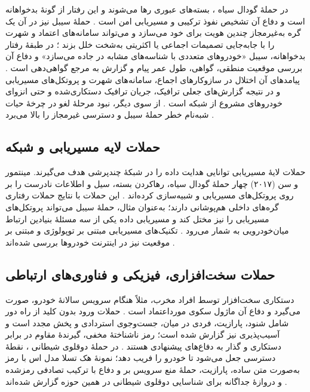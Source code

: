 در حملهٔ گودال سیاه ، بسته‌های عبوری رها می‌شوند و این رفتار از گونهٔ بدخواهانه است و دفاع آن تشخیص نفوذ ترکیبی و مسیریابی امن است \cite{farsimadanReviewSecurityChallenges2025}. حملهٔ سیبل  نیز در آن یک گره به‌غیرمجاز چندین هویت برای خود می‌سازد و می‌تواند سامانه‌های اعتماد و شهرت را با جابه‌جایی تصمیمات اجماعی یا اکثریتی به‌شخت خلل بزند \cite{VanetSecurityPrivacy}؛ در طبقهٔ رفتار بدخواهانه، سیبل «خودروهای متعددی با شناسه‌های مشابه در جاده می‌سازد» و دفاع آن بررسی موقعیت منطقی، گواهی، طول عمر پیام و گزارش به مرجع گواهی‌دهی است \cite{farsimadanReviewSecurityChallenges2025}. پیامدهای آن اختلال در سازوکارهای اجماع، سامانه‌های شهرت و پروتکل‌های مسیریابی و در نتیجه گزارش‌های جعلی ترافیک، جریان ترافیک دستکاری‌شده و حتی انزوای خودروهای مشروع از شبکه است \cite{VanetSecurityPrivacy}. از سوی دیگر، نبود مرحلهٔ لغو در چرخهٔ حیات شبه‌نام خطر حملهٔ سیبل و دسترسی غیرمجاز را بالا می‌برد \cite{rahmawatiagustinaSystematicLiteratureReview2025}.

\subsection{حملات لایه مسیریابی و شبکه}

حملات لایهٔ مسیریابی توانایی هدایت داده را در شبکهٔ چندپرشی هدف می‌گیرند. مینتمور و سن (۲۰۱۷) چهار حملهٔ گودال سیاه، رهاکردن بسته، سیل و اطلاعات نادرست را بر روی پروتکل‌های مسیریابی  و  شبیه‌سازی کرده‌اند \cite{VanetSecurityPrivacy}. این حملات با نتایج حملات رفتاری گره‌های داخلی هم‌پوشانی دارند؛ به‌عنوان مثال، حملهٔ سیبل می‌تواند پروتکل‌های مسیریابی را نیز مختل کند \cite{VanetSecurityPrivacy} و مسیریابی داده یکی از سه مسئلهٔ بنیادین ارتباط میان‌خودرویی به شمار می‌رود \cite{hozouriOverviewVANETVehicular2023}. تکنیک‌های مسیریابی مبتنی بر توپولوژی و مبتنی بر موقعیت نیز در اینترنت خودروها بررسی شده‌اند \cite{xuInternetVehiclesBig2018}.

\subsection{حملات سخت‌افزاری، فیزیکی و فناوری‌های ارتباطی}

دستکاری سخت‌افزار  توسط افراد مخرب، مثلاً هنگام سرویس سالانهٔ خودرو، صورت می‌گیرد و دفاع آن ماژول سکوی مورداعتماد است \cite{farsimadanReviewSecurityChallenges2025}. حملات ورود بدون کلید از راه دور  شامل شنود، پارازیت، فردی در میان، جست‌وجوی استردادی و پخش مجدد است و آسیب‌پذیری  نیز گزارش شده است؛ رمز ناشناختهٔ مخفی، گیرندهٔ مقاوم در برابر دستکاری و گذار به  دفاع‌های پیشنهادی هستند \cite{farsimadanReviewSecurityChallenges2025}. در حملهٔ دوقلوی شیطانی ، نقطهٔ دسترسی  جعل می‌شود تا خودرو را فریب دهد؛ نمونهٔ هک تسلا مدل اس با رمز  به‌صورت متن ساده، پارازیت، حملهٔ منع سرویس بر  و دفاع با ترکیب تصادفی رمزشده و دروازهٔ جداگانه برای شناسایی دوقلوی شیطانی در همین حوزه گزارش شده‌اند \cite{farsimadanReviewSecurityChallenges2025}.

